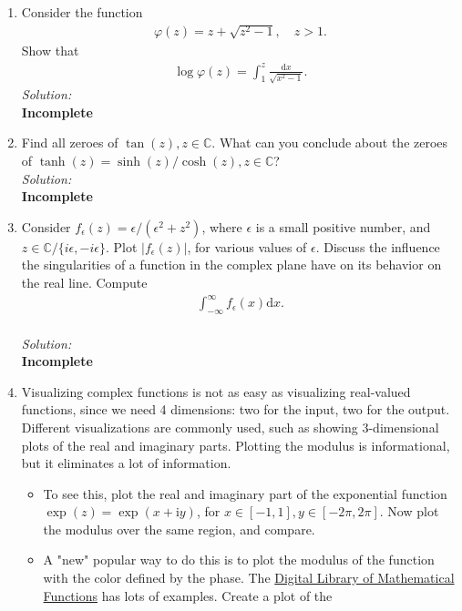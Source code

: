 \documentclass[10pt]{amsart}
\newcommand{\D}{\mathrm{d}}
\newcommand{\I}{\mathrm{i}}
\theoremstyle{nonumberplain}
\begin{document}
\begin{enumerate}[label={\bf {\arabic*}:}]
\item Consider the function
    \begin{align*}
      \varphi(z) = z + \sqrt{z^2 - 1}, \quad z > 1.
    \end{align*}
    Show that
    \begin{align*}
      \log \varphi(z) = \int_1^z \frac{\D x}{\sqrt{x^2 - 1}}.
    \end{align*}
\textit{Solution:} \\
\textbf{Incomplete} \\
\item Find all zeroes of $\tan (z), z \in \mathbb{C}$. What can you
  conclude about the zeroes of $\tanh (z)=\sinh (z) / \cosh (z), z \in
  \mathbb C$?\\
\textit{Solution:} \\
\textbf{Incomplete} \\
\item Consider $f_\epsilon(z)=\epsilon /\left(\epsilon^2+z^2\right)$, where
  $\epsilon$ is a small positive number, and $z \in \mathbb{C} /\{i
  \epsilon,-i \epsilon\}$. Plot $\left|f_\epsilon(z)\right|$, for various
  values of $\epsilon$. Discuss the influence the singularities of a
  function in the complex plane have on its behavior on the real
  line. Compute
  \begin{align*}
    \int_{-\infty}^\infty f_\epsilon(x) \D x.
  \end{align*}\\
\textit{Solution:} \\
\textbf{Incomplete} \\
\item Visualizing complex functions is not as easy as visualizing
  real-valued functions, since we need 4 dimensions: two for the input,
  two for the output. Different visualizations are commonly used, such
  as showing 3-dimensional plots of the real and imaginary
  parts. Plotting the modulus is informational, but it eliminates a
  lot of information.
  \begin{itemize}
\item To see this, plot the real and imaginary part of the exponential function $\exp (z)=\exp (x+\I y)$, for $x \in[-1,1], y \in[-2 \pi, 2 \pi]$. Now plot the modulus over the same region, and compare.
\item A "new" popular way to do this is to plot the modulus of the
function with the color defined by the phase. The \href{https://dlmf.nist.gov/}{Digital Library of
Mathematical Functions} has lots of examples. Create a plot of the

\end{itemize}
\end{enumerate}
\end{document}

